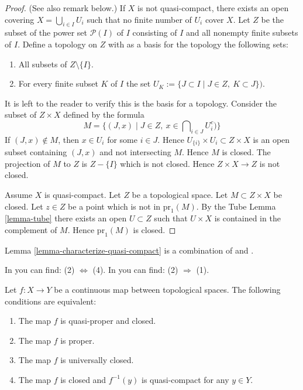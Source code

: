 \begin{proof}
(See also remark below.)
If $X$ is not quasi-compact, there exists an open covering
$X = \bigcup_{i \in I} U_i$ such that no finite
number of $U_i$ cover $X$.
Let $Z$ be the subset of the power set $\mathcal{P}(I)$ of $I$
consisting of $I$ and all nonempty finite subsets of $I$.
Define a topology on $Z$ with as a basis for the topology
the following sets:
\begin{enumerate}
\item All subsets of $Z\setminus\{I\}$.
\item For every finite subset $K$ of $I$ the set
$U_K := \{J\subset I \mid J \in Z, \ K\subset J \})$.
\end{enumerate}
It is left to the reader to verify this is the basis for a topology.
Consider the subset of $Z \times X$ defined by the formula
$$
M = \{(J, x) \mid J \in Z, \ x \in \bigcap\nolimits_{i \in J} U_i^c)\}
$$
If $(J, x) \not \in M$, then $x \in U_i$ for some $i \in J$.
Hence $U_{\{i\}} \times U_i \subset Z \times X$ is an open
subset containing $(J, x)$ and not intersecting $M$. Hence
$M$ is closed. The projection of $M$ to $Z$ is $Z-\{I\}$
which is not closed. Hence $Z \times X \to Z$ is not closed.

\medskip\noindent
Assume $X$ is quasi-compact. Let $Z$ be a topological space.
Let $M \subset  Z \times X$ be closed. Let $z \in Z$ be a point
which is not in $\text{pr}_1(M)$. By the Tube Lemma \ref{lemma-tube}
there exists an open $U \subset Z$ such that $U \times X$ is
contained in the complement of $M$. Hence $\text{pr}_1(M)$ is closed.
\end{proof}

\begin{remark}
\label{remark-lemma-literature}
Lemma \ref{lemma-characterize-quasi-compact} is a combination of
\cite[I, p. 75, Lemme 1]{Bourbaki} and
\cite[I, p. 76, Corollaire 1]{Bourbaki}.
\end{remark}

\begin{theorem}
\label{theorem-characterize-proper}
\begin{reference}
In \cite[I, p. 75, Theorem 1]{Bourbaki} you can find:
(2) $\Leftrightarrow$ (4).
In \cite[I, p. 77, Proposition 6]{Bourbaki} you can find:
(2) $\Rightarrow$ (1).
\end{reference}
Let $f: X\to Y$ be a continuous map between
topological spaces. The following conditions are equivalent:
\begin{enumerate}
\item The map $f$ is quasi-proper and closed.
\item The map $f$ is proper.
\item The map $f$ is universally closed.
\item The map $f$ is closed and $f^{-1}(y)$ is quasi-compact for any
$y\in Y$.
\end{enumerate}
\end{theorem}

